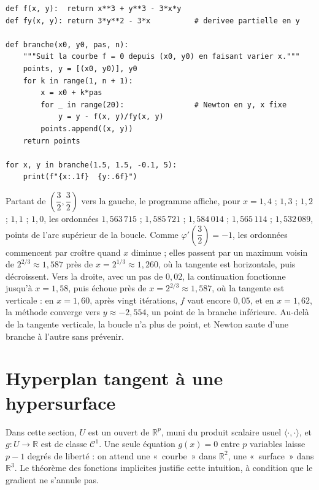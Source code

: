 \documentclass[a4paper,twoside]{report}
\newcommand{\R}{\mathbb{R}}
\newcommand{\ps}[2]{\langle #1, #2 \rangle}       %
\newcommand{\Cc}{\mathcal{C}}                     %
\begin{document}
\begin{lstlisting}
def f(x, y):  return x**3 + y**3 - 3*x*y
def fy(x, y): return 3*y**2 - 3*x          # derivee partielle en y

def branche(x0, y0, pas, n):
    """Suit la courbe f = 0 depuis (x0, y0) en faisant varier x."""
    points, y = [(x0, y0)], y0
    for k in range(1, n + 1):
        x = x0 + k*pas
        for _ in range(20):                # Newton en y, x fixe
            y = y - f(x, y)/fy(x, y)
        points.append((x, y))
    return points

for x, y in branche(1.5, 1.5, -0.1, 5):
    print(f"{x:.1f}  {y:.6f}")
\end{lstlisting}

\noindent Partant de $\left(\dfrac{3}{2}, \dfrac{3}{2}\right)$ vers la gauche, le programme affiche, pour $x = 1{,}4$ ; $1{,}3$ ; $1{,}2$ ; $1{,}1$ ; $1{,}0$, les ordonnées $1{,}563\,715$ ; $1{,}585\,721$ ; $1{,}584\,014$ ; $1{,}565\,114$ ; $1{,}532\,089$, points de l'arc supérieur de la boucle. Comme $\varphi'\left(\dfrac{3}{2}\right) = -1$, les ordonnées commencent par croître quand $x$ diminue ; elles passent par un maximum voisin de $2^{2/3} \approx 1{,}587$ près de $x = 2^{1/3} \approx 1{,}260$, où la tangente est horizontale, puis décroissent. Vers la droite, avec un pas de $0{,}02$, la continuation fonctionne jusqu'à $x = 1{,}58$, puis échoue près de $x = 2^{2/3} \approx 1{,}587$, où la tangente est verticale : en $x = 1{,}60$, après vingt itérations, $f$ vaut encore $0{,}05$, et en $x = 1{,}62$, la méthode converge vers $y \approx -2{,}554$, un point de la branche inférieure. Au-delà de la tangente verticale, la boucle n'a plus de point, et Newton saute d'une branche à l'autre sans prévenir.
\newpage
\section[Hyperplan tangent]{Hyperplan tangent à une hypersurface}

Dans cette section, $U$ est un ouvert de $\R^{p}$, muni du produit scalaire usuel $\ps{\cdot}{\cdot}$, et $g : U \to \R$ est de classe $\Cc^{1}$. Une seule équation $g(x) = 0$ entre $p$ variables laisse $p - 1$ degrés de liberté : on attend une «~courbe~» dans $\R^{2}$, une «~surface~» dans $\R^{3}$. Le théorème des fonctions implicites justifie cette intuition, à condition que le gradient ne s'annule pas.
\end{document}
